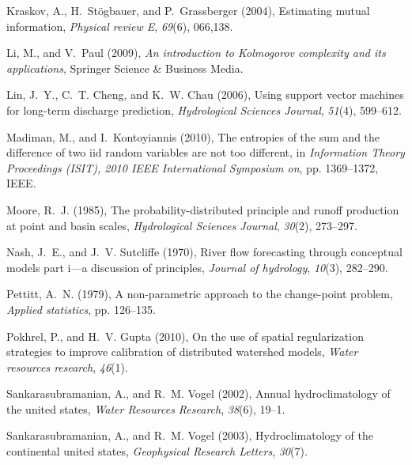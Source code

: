 \documentclass[draft,wrr]{AGUTeX}
\begin{document}
\begin{article}
\begin{thebibliography}{59}
Kraskov, A., H.~St{\"o}gbauer, and P.~Grassberger (2004), Estimating mutual
  information, \textit{Physical review E}, \textit{69}(6), 066,138.

Li, M., and V.~Paul (2009), \textit{An introduction to Kolmogorov complexity
  and its applications}, Springer Science \& Business Media.

Lin, J.~Y., C.~T. Cheng, and K.~W. Chau (2006), Using support vector machines
  for long-term discharge prediction, \textit{Hydrological Sciences Journal},
  \textit{51}(4), 599--612.

Madiman, M., and I.~Kontoyiannis (2010), The entropies of the sum and the
  difference of two iid random variables are not too different, in
  \textit{Information Theory Proceedings (ISIT), 2010 IEEE International
  Symposium on}, pp. 1369--1372, IEEE.

Moore, R.~J. (1985), The probability-distributed principle and runoff
  production at point and basin scales, \textit{Hydrological Sciences Journal},
  \textit{30}(2), 273--297.

Nash, J.~E., and J.~V. Sutcliffe (1970), River flow forecasting through
  conceptual models part i—a discussion of principles, \textit{Journal of
  hydrology}, \textit{10}(3), 282--290.

Pettitt, A.~N. (1979), A non-parametric approach to the change-point problem,
  \textit{Applied statistics}, pp. 126--135.

Pokhrel, P., and H.~V. Gupta (2010), On the use of spatial regularization
  strategies to improve calibration of distributed watershed models,
  \textit{Water resources research}, \textit{46}(1).

Sankarasubramanian, A., and R.~M. Vogel (2002), Annual hydroclimatology of the
  united states, \textit{Water Resources Research}, \textit{38}(6), 19--1.

Sankarasubramanian, A., and R.~M. Vogel (2003), Hydroclimatology of the
  continental united states, \textit{Geophysical Research Letters},
  \textit{30}(7).


\end{thebibliography}
\end{article}
\end{document}
